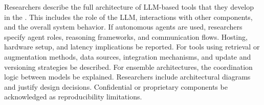 Researchers \must describe the full architecture of LLM-based tools that they develop in the \paper. This includes the role of the LLM, interactions with other components, and the overall system behavior. If autonomous agents are used, researchers \must specify agent roles, reasoning frameworks, and communication flows. Hosting, hardware setup, and latency implications \must be reported. For tools using retrieval or augmentation methods, data sources, integration mechanisms, and update and versioning strategies \must be described. For ensemble architectures, the coordination logic between models \must be explained. Researchers \should include architectural diagrams and justify design decisions. Confidential or proprietary components \must be acknowledged as reproducibility limitations.
